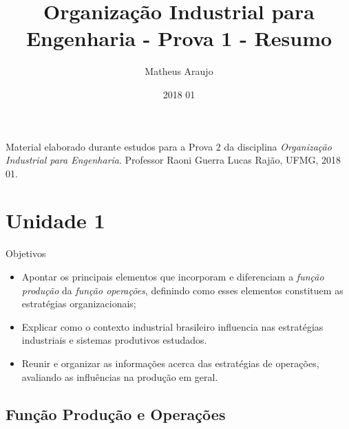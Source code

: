 \documentclass{article}
\title{Organização Industrial para Engenharia - Prova 1 - Resumo}
\author{Matheus Araujo}
\date{2018 01}
\begin{document}
\maketitle

Material elaborado durante estudos para a Prova 2 da disciplina \emph{Organização Industrial para Engenharia}. Professor Raoni Guerra Lucas Rajão, UFMG, 2018 01.

\section{Unidade 1}

Objetivos

\begin{itemize}

    \item Apontar os principais elementos que incorporam e diferenciam a \emph{função produção} da \emph{função operações}, definindo como esses elementos constituem as estratégias organizacionais;
    
    \item Explicar como o contexto industrial brasileiro influencia nas estratégias industriais e sistemas produtivos estudados.
    
    \item Reunir e organizar as informações acerca das estratégias de operações, avaliando as influências na produção em geral.

\end{itemize}

\subsection{Função Produção e Operações}
\end{document}
